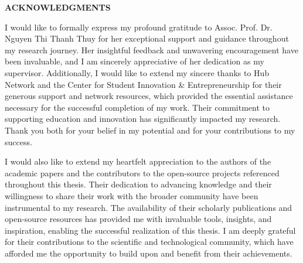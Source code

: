 \documentclass[../Main.tex]{subfiles}
\begin{document}
	\begin{center}
		\Large{\textbf{ACKNOWLEDGMENTS}}\\
	\end{center}
	\vspace{1cm}
	I would like to formally express my profound gratitude to Assoc. Prof. Dr. Nguyen Thi Thanh Thuy
	for her exceptional support and guidance throughout my research journey. Her
	insightful feedback and unwavering encouragement have been invaluable, and I am
	sincerely appreciative of her dedication as my supervisor. Additionally, I would
	like to extend my sincere thanks to Hub Network and the Center for Student Innovation \& Entrepreneurship
	for their generous support and network resources, which provided the essential assistance necessary for the successful completion
	of my work. Their commitment to supporting education and innovation has significantly
	impacted my research. Thank you both for your belief in my potential and for
	your contributions to my success.

	I would also like to extend my heartfelt appreciation to the authors of the
	academic papers and the contributors to the open-source projects referenced
	throughout this thesis. Their dedication to advancing knowledge and their willingness
	to share their work with the broader community have been instrumental to my research.
	The availability of their scholarly publications and open-source resources has
	provided me with invaluable tools, insights, and inspiration, enabling the successful
	realization of this thesis. I am deeply grateful for their contributions to
	the scientific and technological community, which have afforded me the opportunity
	to build upon and benefit from their achievements.
\end{document}
